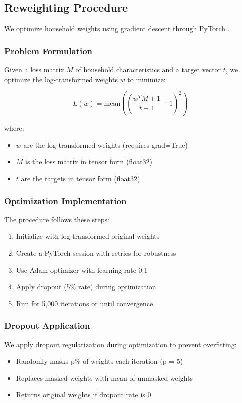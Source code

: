 \subsection{Reweighting Procedure}

We optimize household weights using gradient descent through PyTorch \citep{pytorch2019}.

\subsubsection{Problem Formulation}

Given a loss matrix $M$ of household characteristics and a target vector $t$, we optimize the log-transformed weights $w$ to minimize:

\[ L(w) = \text{mean}\left(\left(\frac{w^T M + 1}{t + 1} - 1\right)^2\right) \]

where:
\begin{itemize}
    \item $w$ are the log-transformed weights (requires grad=True)
    \item $M$ is the loss matrix in tensor form (float32)
    \item $t$ are the targets in tensor form (float32)
\end{itemize}

\subsubsection{Optimization Implementation}

The procedure follows these steps:

\begin{enumerate}
    \item Initialize with log-transformed original weights
    \item Create a PyTorch session with retries for robustness
    \item Use Adam optimizer with learning rate 0.1
    \item Apply dropout (5\% rate) during optimization
    \item Run for 5,000 iterations or until convergence
\end{enumerate}

\subsubsection{Dropout Application}

We apply dropout regularization during optimization to prevent overfitting:
\begin{itemize}
    \item Randomly masks p\% of weights each iteration (p = 5)
    \item Replaces masked weights with mean of unmasked weights
    \item Returns original weights if dropout rate is 0
\end{itemize}

